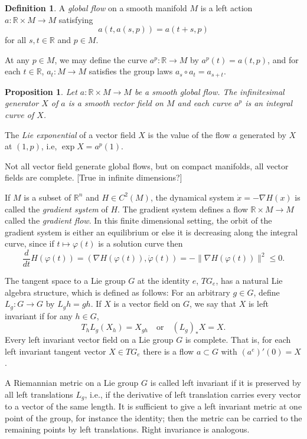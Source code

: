 \documentclass{article}
\theoremstyle{plain}
\newtheorem{prop}[teo]{Proposition}
\theoremstyle{definition}
\newtheorem{defin}[teo]{Definition}
\newcommand{\R}{\ensuremath{\mathbb{R}}}
\newcommand{\mf}{\ensuremath{\mathfrak}}
\begin{document}
\begin{defin}
	A \textit{global flow} on a smooth manifold $M$ is a left action $a:\R\times M\to M$ satisfying
	\[
	  a(t,a(s,p))=a(t+s,p)
	\]
	for all $s,t\in\R$ and $p\in M$. 
\end{defin}

At any $p\in M$, we may define the curve $a^p:\R\to M$ by $a^p(t)=a(t,p)$, and for each $t\in\R$, $a_t:M\to M$ satisfies the group laws $a_s\circ a_t=a_{s+t}$.

\begin{prop}
	Let $a:\R\times M\to M$ be a smooth global flow. The infinitesimal generator $X$ of $a$ is a smooth vector field on $M$ and each curve $a^p$ is an integral curve of $X$.
\end{prop}

The \textit{Lie exponential} of a vector field $X$ is the value of the flow $a$ generated by $X$ at $(1,p)$, i.e, $\exp X=a^p(1)$. 

Not all vector field generate global flows, but on compact manifolds, all vector fields are complete. [True in infinite dimensions?]

If $M$ is a subset of $\R^n$ and $H\in C^2(M)$, the dynamical system $\dot{x}=-\nabla H(x)$ is called the \textit{gradient system} of $H$. The gradient system defines a flow $\R\times M\to M$ called the \textit{gradient flow}. In this finite dimensional setting, the orbit of the gradient system is either an equilibrium or else it is decreasing along the integral curve, since if $t\mapsto \varphi(t)$ is a solution curve then
\[
\frac{d}{dt}H(\varphi(t))=(\nabla H(\varphi(t)),\dot{\varphi}(t))=-\|\nabla H(\varphi(t))\|^2\leq 0.
\]

The tangent space to a Lie group $G$ at the identity $e$, $TG_e$, has a natural
Lie algebra structure, which is defined as follows:  For an arbitrary $g\in G$, define $L_g: G\to G$ by $L_gh=gh$. If $X$ is a vector field on $G$, we say that $X$ is left invariant if for any $h\in G$,
\[
T_hL_g(X_h) = X_{gh}\quad \mathrm{or}\quad (L_g)_*X=X.
\]
Every left invariant vector field on a Lie group $G$ is complete. That is, for each left invariant tangent vector $X\in TG_e$ there is a flow $a\subset G$ with $(a^e)'(0)=X$.

A Riemannian metric on a Lie group $G$ is called left invariant if it is preserved
by all left translations $L_g$, i.e., if the derivative of left translation carries every
vector to a vector of the same length. It is sufficient to give a left invariant metric at one point of the group, for instance the identity; then the metric can be carried to the remaining points by left translations. Right invariance is analogous.
%
\end{document}
